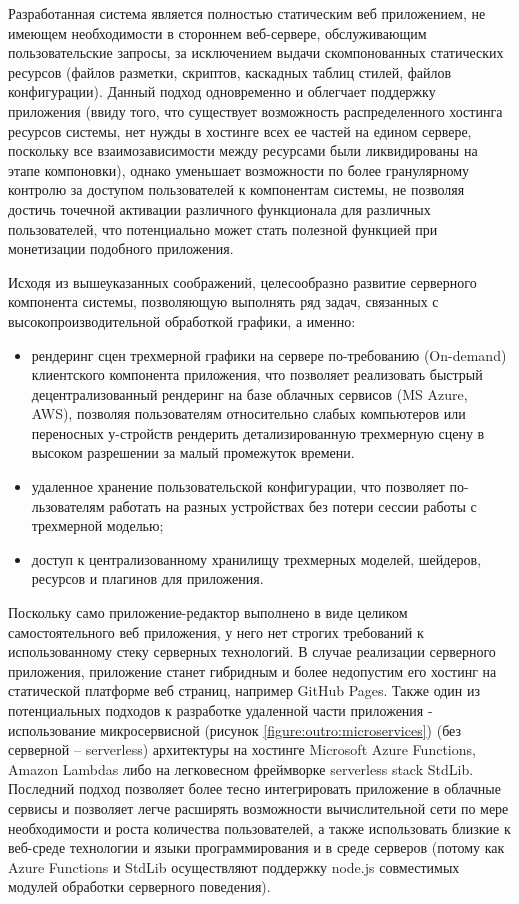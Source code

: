Разработанная система является полностью статическим веб приложением, не имеющем необходимости в стороннем веб-сервере, обслуживающим пользовательские запросы, за исключением выдачи скомпонованных
статических ресурсов (файлов разметки, скриптов, каскадных таблиц стилей, файлов конфигурации). Данный подход одновременно и облегчает поддержку приложения (ввиду того, что существует возможность
распределенного хостинга ресурсов системы, нет нужды в хостинге всех ее частей на едином сервере, поскольку все взаимозависимости между ресурсами были ликвидированы на этапе компоновки), однако
уменьшает возможности по более гранулярному контролю за доступом пользователей к компонентам системы, не позволяя достичь точечной активации различного функционала для различных пользователей, что
потенциально может стать полезной функцией при монетизации подобного приложения.

Исходя из вышеуказанных соображений, целесообразно развитие серверного компонента системы, позволяющую выполнять ряд задач, связанных с высокопроизводительной обработкой графики, а именно:
\begin{itemize}
\item рендеринг сцен трехмерной графики на сервере по-требованию (On-demand) клиентского компонента приложения, что позволяет реализовать быстрый децентрализованный рендеринг на базе облачных
сервисов (MS Azure, AWS), позволяя пользователям относительно слабых компьютеров или переносных у-стройств рендерить детализированную трехмерную сцену в высоком разрешении за малый промежуток
времени.
\item удаленное хранение пользовательской конфигурации, что позволяет по-льзователям работать на разных устройствах без потери сессии работы с трехмерной моделью;
\item доступ к централизованному хранилищу трехмерных моделей, шейдеров, ресурсов и плагинов для приложения.
\end{itemize}

Поскольку само приложение-редактор выполнено в виде целиком самостоятельного веб приложения, у него нет строгих требований к использованному стеку серверных технологий. В случае реализации
серверного приложения, приложение станет гибридным и более недопустим его хостинг на статической платформе веб страниц, например GitHub Pages. Также один из потенциальных подходов к разработке
удаленной части приложения - использование микросервисной (рисунок \ref{figure:outro:microservices}) (без серверной -- serverless) архитектуры на хостинге Microsoft Azure Functions, Amazon Lambdas либо на легковесном фреймворке 
serverless stack StdLib. Последний подход позволяет более тесно интегрировать приложение в облачные сервисы и позволяет легче расширять возможности вычислительной сети по мере необходимости и
роста количества пользователей, а также использовать близкие к веб-среде технологии и языки программирования и в среде серверов (потому как Azure Functions\cite{azure} и StdLib\cite{stdlib} осуществляют поддержку node.js
совместимых модулей обработки серверного поведения).

